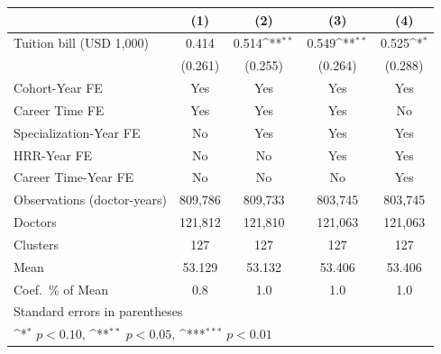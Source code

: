 {
\def\sym#1{\ifmmode^{#1}\else\(^{#1}\)\fi}
\begin{tabular}{l*{4}{c}}
\hline\hline
                    &\multicolumn{1}{c}{(1)}         &\multicolumn{1}{c}{(2)}         &\multicolumn{1}{c}{(3)}         &\multicolumn{1}{c}{(4)}         \\
\hline
Tuition bill (USD 1,000)&       0.414         &       0.514\sym{**} &       0.549\sym{**} &       0.525\sym{*}  \\
                    &     (0.261)         &     (0.255)         &     (0.264)         &     (0.288)         \\
[1em]
Cohort-Year FE      &         Yes         &         Yes         &         Yes         &         Yes         \\
[1em]
Career Time FE      &         Yes         &         Yes         &         Yes         &          No         \\
[1em]
Specialization-Year FE&          No         &         Yes         &         Yes         &         Yes         \\
[1em]
HRR-Year FE         &          No         &          No         &         Yes         &         Yes         \\
[1em]
Career Time-Year FE &          No         &          No         &          No         &         Yes         \\
\hline
Observations (doctor-years)&     809,786         &     809,733         &     803,745         &     803,745         \\
Doctors             &     121,812         &     121,810         &     121,063         &     121,063         \\
Clusters            &         127         &         127         &         127         &         127         \\
Mean                &      53.129         &      53.132         &      53.406         &      53.406         \\
Coef.\ \% of Mean   &         0.8         &         1.0         &         1.0         &         1.0         \\
\hline\hline
\multicolumn{5}{l}{\footnotesize Standard errors in parentheses}\\
\multicolumn{5}{l}{\footnotesize \sym{*} \(p<0.10\), \sym{**} \(p<0.05\), \sym{***} \(p<0.01\)}\\
\end{tabular}
}
